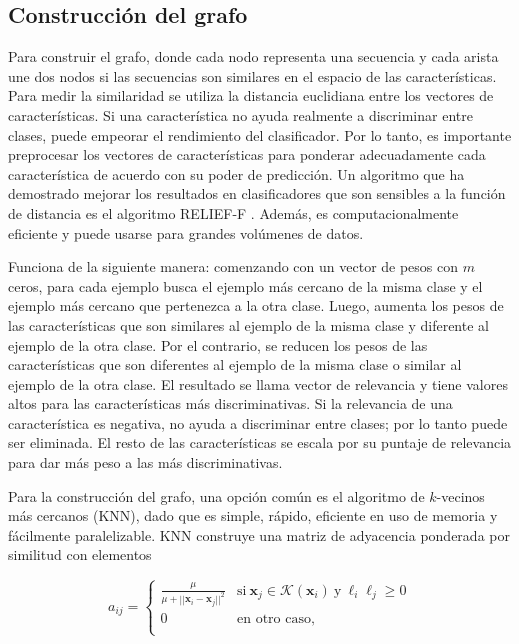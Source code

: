 \subsection{Construcción del grafo}

Para construir el grafo, donde cada nodo representa una secuencia y cada arista une dos nodos si las secuencias son similares en el espacio de las
características. Para medir la similaridad se utiliza la distancia euclidiana entre los vectores de características. Si una característica no ayuda
realmente a discriminar entre clases, puede empeorar el rendimiento del clasificador. Por lo tanto, es importante preprocesar los vectores de características
para ponderar adecuadamente cada característica de acuerdo con su poder de predicción. Un algoritmo que ha demostrado mejorar los resultados en
clasificadores que son sensibles a la función de distancia es el algoritmo RELIEF-F \citep{kononenko1994estimating, wettschereck1997review}. Además, es
computacionalmente eficiente y puede usarse para grandes volúmenes de datos.

Funciona de la siguiente manera: comenzando con un vector de pesos con $m$ ceros, para cada ejemplo busca el ejemplo más cercano de la misma clase y el
ejemplo más cercano que pertenezca a la otra clase. Luego, aumenta los pesos de las características que son similares al ejemplo de la misma clase y
diferente al ejemplo de la otra clase. Por el contrario, se reducen los pesos de las características que son diferentes al ejemplo de la misma clase o similar
al ejemplo de la otra clase. El resultado se llama vector de relevancia y tiene valores altos para las características más discriminativas. Si la relevancia
de una característica es negativa, no ayuda a discriminar entre clases; por lo tanto puede ser eliminada. El resto de las características se escala por su
puntaje de relevancia para dar más peso a las más discriminativas.

Para la construcción del grafo, una opción común es el algoritmo de $k$-vecinos más cercanos (KNN), dado que es simple, rápido, eficiente en uso de
memoria y fácilmente paralelizable. KNN construye una matriz de adyacencia ponderada por similitud con elementos

\begin{equation}
	a_{ij} =
	\begin{cases}
		\frac{\mu}{\mu + ||\mathbf{x}_{i} - \mathbf{x}_{j}||^2} & \text{si} \ \mathbf{x}_{j} \in  \mathcal{K}(\mathbf{x}_{i}) \ \text{y} \ \ell_{i}
		\ell_{j} \geq 0 \\
		0 & \text{en otro caso,} \\
	\end{cases}
\end{equation}

